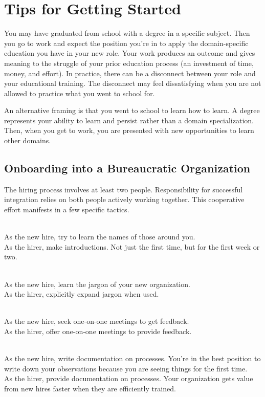\section{Tips for Getting Started}

You may have graduated from school with a degree in a specific subject. Then you go to work and expect the position you're in to apply the domain-specific education you have in your new role. Your work produces an outcome and gives meaning to the struggle of your prior education process (an investment of time, money, and effort). In practice, there can be a disconnect between your role and your educational training. The disconnect may feel dissatisfying when you are not allowed to practice what you went to school for.

An alternative framing is that you went to school to learn how to learn. A degree represents your ability to learn and persist rather than a domain specialization. Then, when you get to work, you are presented with new opportunities to learn other domains. 

\subsection*{Onboarding into a Bureaucratic Organization}

The hiring process involves at least two people. Responsibility for successful integration relies on both people actively working together. This cooperative effort manifests in a few specific tactics. 

\ \\
As the new hire, try to learn the names of those around you.\\
As the hirer, make introductions. Not just the first time, but for the first week or two.

\ \\
As the new hire, learn the jargon of your new organization.\\
As the hirer, explicitly expand jargon when used.

\ \\
As the new hire, seek one-on-one meetings to get feedback.\\
As the hirer, offer one-on-one meetings to provide feedback.

\ \\
As the new hire, write documentation on processes. You're in the best position to write down your observations because you are seeing things for the first time.\\
As the hirer, provide documentation on processes. Your organization gets value from new hires faster when they are efficiently trained. 

